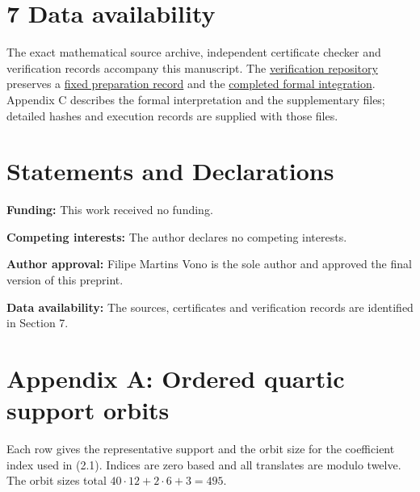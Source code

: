 \documentclass[11pt,a4paper]{article}
\begin{document}
\section*{7 Data availability}

The exact mathematical source archive, independent certificate checker and verification records accompany this manuscript. The \href{https://github.com/contatofilipevono-rgb/hrsbf-bent-verification}{verification repository} preserves a \href{https://github.com/contatofilipevono-rgb/hrsbf-bent-verification/tree/1e0e052/research_updates/2026_10_21_preprint}{fixed preparation record} and the \href{https://github.com/contatofilipevono-rgb/hrsbf-bent-verification/tree/9be0d98/research_updates/2026_10_20_final_integration}{completed formal integration}. Appendix C describes the formal interpretation and the supplementary files; detailed hashes and execution records are supplied with those files.

\section*{Statements and Declarations}

\textbf{Funding:} This work received no funding.

\textbf{Competing interests:} The author declares no competing interests.

\textbf{Author approval:} Filipe Martins Vono is the sole author and approved the final version of this preprint.

\textbf{Data availability:} The sources, certificates and verification records are identified in Section 7.

\section*{Appendix A: Ordered quartic support orbits}

Each row gives the representative support and the orbit size for the coefficient index used in (2.1). Indices are zero based and all translates are modulo twelve. The orbit sizes total $40\cdot12+2\cdot6+3=495$.
\end{document}
